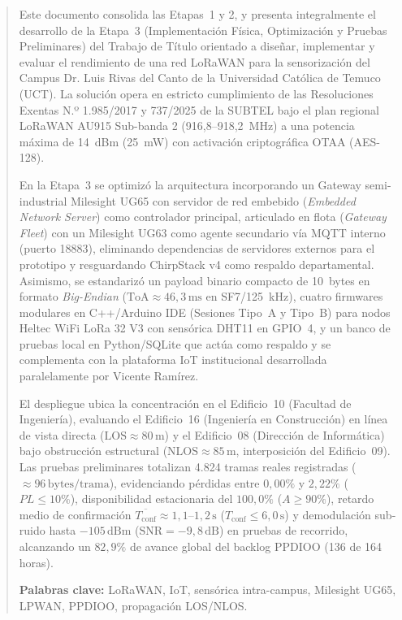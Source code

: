 \documentclass[12pt,oneside,openany,spanish,oldfontcommands]{memoir}
\begin{document}
\tableofcontents*
\clearpage

\listoftables*
\clearpage

\listoffigures*
\clearpage

\thispagestyle{empty}

\begin{abstract}
\setlength{\parskip}{3pt}

Este documento consolida las Etapas~1 y 2, y presenta integralmente el desarrollo de la Etapa~3 (Implementación Física, Optimización y Pruebas Preliminares) del Trabajo de Título orientado a diseñar, implementar y evaluar el rendimiento de una red LoRaWAN para la sensorización del Campus Dr. Luis Rivas del Canto de la Universidad Católica de Temuco (UCT). La solución opera en estricto cumplimiento de las Resoluciones Exentas N.º 1.985/2017 y 737/2025 de la SUBTEL bajo el plan regional LoRaWAN AU915 Sub-banda 2 (916,8--918,2~MHz) a una potencia máxima de 14~dBm (25~mW) con activación criptográfica OTAA (AES-128).

En la Etapa~3 se optimizó la arquitectura incorporando un Gateway semi-industrial Milesight UG65 con servidor de red embebido (\textit{Embedded Network Server}) como controlador principal, articulado en flota (\textit{Gateway Fleet}) con un Milesight UG63 como agente secundario vía MQTT interno (puerto 18883), eliminando dependencias de servidores externos para el prototipo y resguardando ChirpStack v4 como respaldo departamental. Asimismo, se estandarizó un payload binario compacto de 10~bytes en formato \textit{Big-Endian} ($\text{ToA} \approx 46,3\,\text{ms}$ en SF7/125~kHz), cuatro firmwares modulares en C++/Arduino IDE (Sesiones Tipo~A y Tipo~B) para nodos Heltec WiFi LoRa 32 V3 con sensórica DHT11 en GPIO~4, y un banco de pruebas local en Python/SQLite que actúa como respaldo y se complementa con la plataforma IoT institucional desarrollada paralelamente por Vicente Ramírez.

El despliegue ubica la concentración en el Edificio~10 (Facultad de Ingeniería), evaluando el Edificio~16 (Ingeniería en Construcción) en línea de vista directa ($\text{LOS} \approx 80\,\text{m}$) y el Edificio~08 (Dirección de Informática) bajo obstrucción estructural ($\text{NLOS} \approx 85\,\text{m}$, interposición del Edificio~09). Las pruebas preliminares totalizan 4.824 tramas reales registradas ($\approx 96\,\text{bytes/trama}$), evidenciando pérdidas entre $0,00\%$ y $2,22\%$ ($PL \le 10\%$), disponibilidad estacionaria del $100,0\%$ ($A \ge 90\%$), retardo medio de confirmación $\overline{T_{\mathrm{conf}}} \approx 1,1\text{--}1,2\,\text{s}$ ($T_{\mathrm{conf}} \le 6,0\,\text{s}$) y demodulación sub-ruido hasta $-105\,\text{dBm}$ ($\text{SNR} = -9,8\,\text{dB}$) en pruebas de recorrido, alcanzando un $82,9\%$ de avance global del backlog PPDIOO (136 de 164 horas).

\vspace{0.3cm}
\noindent\textbf{Palabras clave:} LoRaWAN, IoT, sensórica intra-campus, Milesight UG65, LPWAN, PPDIOO, propagación LOS/NLOS.
\end{abstract}
\end{document}
